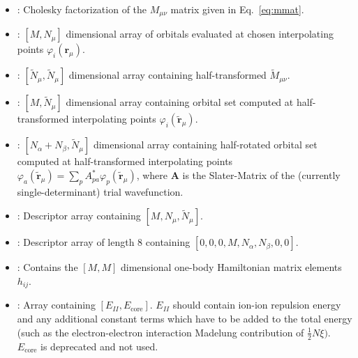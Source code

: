 \begin{itemize}
    \item {}: Cholesky factorization of the $M_{\mu\nu}$ matrix given in Eq.~\ref{eq:mmat}.
    \item {}: $[M,N_\mu]$ dimensional array of orbitals evaluated at chosen interpolating points $\varphi_i(\mathbf{r}_\mu)$.
    \item {}: $[\tilde{N}_\mu,\tilde{N}_\mu]$ dimensional array containing half-transformed $\tilde{M}_{\mu\nu}$.
    \item {}: $[M,\tilde{N}_\mu]$ dimensional array containing orbital set computed at half-transformed interpolating points $\varphi_i(\tilde{\mathbf{r}}_\mu)$.
    \item {}: $[N_\alpha+N_\beta,\tilde{N}_\mu]$ dimensional array containing half-rotated orbital set computed at half-transformed interpolating points $\varphi_a(\tilde{\mathbf{r}}_\mu) = \sum_{p} A_{pa}^* \varphi_{p}(\tilde{\mathbf{r}}_\mu)$, where $\mathbf{A}$ is the Slater-Matrix of the (currently single-determinant) trial wavefunction.
    \item {}: Descriptor array containing $[M, N_\mu, \tilde{N}_\mu]$.
    \item {}: Descriptor array of length 8 containing $[0,0,0,M,N_\alpha,N_\beta,0,0]$.
    \item {}: Contains the $[M,M]$ dimensional one-body Hamiltonian matrix elements $h_{ij}$.
    \item {}: Array containing $[E_{II}, E_{\mathrm{core}}]$. $E_{II}$ should contain ion-ion repulsion energy and any additional constant terms which have to be added to the total energy (such as the electron-electron interaction Madelung contribution of $\frac{1}{2} N \xi )$. $E_{\mathrm{core}}$ is deprecated and not used.
\end{itemize}

